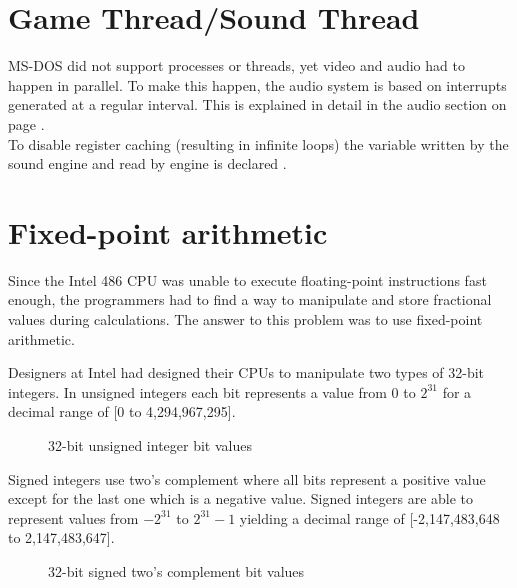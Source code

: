 \section{Game Thread/Sound Thread}
MS-DOS did not support processes or threads, yet video and audio had to happen in parallel. To make this happen, the audio system is based on interrupts generated at a regular interval. This is explained in detail in the audio section on page \pageref{dmx_section}.\\
To disable register caching (resulting in infinite loops) the variable written by the sound engine and read by \doom{} engine is declared .







\section{Fixed-point arithmetic}
Since the Intel 486 CPU was unable to execute floating-point instructions fast enough, the programmers had to find a way to manipulate and store fractional values during calculations. The answer to this problem was to use fixed-point arithmetic.\\
\par
Designers at Intel had designed their CPUs to manipulate two types of 32-bit integers. In unsigned integers each bit represents a value from $0$ to $2^{31}$ for a decimal range of [0 to 4,294,967,295].\\
\par
\begin{figure}[H]
 \centering
  
 \caption{32-bit unsigned integer bit values} 
\end{figure}
\par
Signed integers use two's complement where all bits represent a positive value except for the last one which is a negative value. Signed integers are able to represent values from $-2^{31}$ to $2^{31}-1$ yielding a decimal range of [-2,147,483,648 to 2,147,483,647].\\
\par
\begin{figure}[H]
 \centering
  
 \caption{32-bit signed two's complement bit values} 
\end{figure}
\par


